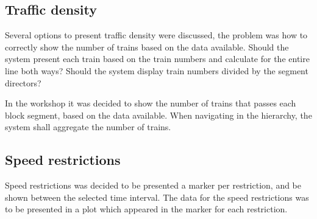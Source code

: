 \subsection{Traffic density} %
\label{sub:traffic_density}
Several options to present traffic density were discussed, the problem was how
to correctly show the number of trains based on the data available. 
Should the system present each train based on the train numbers and 
calculate for the entire line both ways? Should the system display train 
numbers divided by the segment directors? 

In the workshop it was decided to show the number of trains that passes each 
block segment, based on the data available. When navigating in the hierarchy,
the system shall aggregate the number of trains.


\subsection{Speed restrictions} %
\label{sub:speed_restrictions}
Speed restrictions was decided to be presented a marker per restriction, and be
shown between the selected time interval. The data for the speed restrictions
was to be presented in a plot which appeared in the marker for each
restriction.






